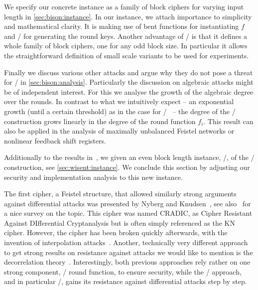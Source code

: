 We specify our concrete instance as a family of block ciphers for varying input length in \cref{sec:bison:instance}.
In our instance, we attach importance to simplicity and mathematical clarity.
It is making use of bent functions for instantiating $f$ and \LFSRp/ for generating the round keys.
Another advantage of \bison/ is that it defines a whole family of block ciphers, one for any odd block size.
In particular it allows the straightforward definition of small scale variants to be used for experiments.

Finally we discuss various other attacks and argue why they do not pose a threat for \bison/ in \cref{sec:bison:analysis}.
Particularly the discussion on algebraic attacks might be of independent interest.
For this we analyse the growth of the algebraic degree over the rounds.
In contrast to what we intuitively expect -- an exponential growth (until a certain threshold) as in the case for \SPNp/~\cite{FSE:BouCanDeC11} -- the degree of the \WSN/ construction grows linearly in the degree of the round function $f_i$.
This result can also be applied in the analysis of maximally unbalanced Feistel networks or nonlinear feedback shift registers.


Additionally to the results in~\cite{EC:CLLNW19}, we given an even block length instance, \wisent/, of the \WSN/ construction, see \cref{sec:wisent:instance}.
We conclude this section by adjusting our security and implementation analysis to this new instance.


The first cipher, a Feistel structure, that allowed similarly strong arguments against differential attacks was presented by Nyberg and Knudsen~\cite{JC:NybKnu95}, see also~\cite{FSE:Nyberg12} for a nice survey on the topic.
This cipher was named CRADIC, as Cipher Resistant Against DIfferential Cryptanalysis but is often simply referenced as the KN cipher.
However, the cipher has been broken quickly afterwards, with the invention of interpolation attacks~\cite{FSE:JakKnu97}.
Another, technically very different approach to get strong results on resistance against attacks we would like to mention is the decorrelation theory~\cite{STACS:Vaudenay98}.
Interestingly, both previous approaches rely rather on one strong component, \ie/ round function, to ensure security, while the \WSN/ approach, and in particular \bison/, gains its resistance against differential attacks step by step.

